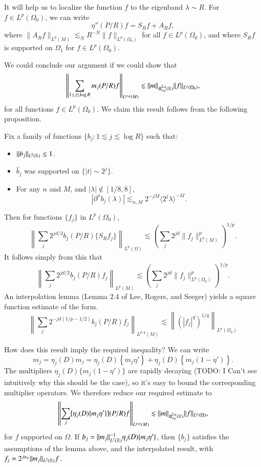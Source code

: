 It will help us to localize the function $f$ to the eigenband $\lambda \sim R$. For $f \in L^p(\Omega_0)$, we can write
%
\[ \eta''(P/R) f = S_R f + A_R f, \]
%
where $\| A_R f \|_{L^p(M)} \lesssim_N R^{-N} \| f \|_{L^p(\Omega_0)}$ for all $f \in L^p(\Omega_0)$, and where $S_R f$ is supported on $\Omega_1$ for $f \in L^p(\Omega_0)$.

We could conclude our argument if we could show that
%
\[ \left\| \sum_{1 \lesssim j \lesssim \log R} m_j(P/R) f \right\|_{L^{p,q}(M)} \lesssim \| m \|_{B_{\alpha_p}^{2,q}(\operatorname{\mathbb{R}})} \| f \|_{L^p(\Omega_0)}, \]
%
for all functions $f \in L^p(\Omega_0)$. We claim this result follows from the following proposition.

\begin{lemma}
    Fix a family of functions $\{ b_j: 1 \lesssim j \lesssim \log R \}$ such that:
    \begin{itemize}
        \item $\| b_j \|_{L^2(\operatorname{\mathbb{R}})} \lesssim 1$.

        \item $\widehat{b}_j$ was supported on $\{ |t| \sim 2^j \}$.

        \item For any $n$ and $M$, and $|\lambda| \not \in [1/8, 8]$,
        \[ |\partial^n b_j(\lambda)| \lesssim_{n,M} 2^{-jM} \langle 2^j \lambda \rangle^{-M}. \]
    \end{itemize}
    Then for functions $\{ f_j \}$ in $L^p(\Omega_0)$,
    \[ \left\| \sum_j 2^{jd/2} b_j(P/R) \{ S_R f_j \} \right\|_{L^p(\Omega)} \lesssim \left( \sum_j 2^{jd} \| f_j \|_{L^p(M)}^p \right)^{1/p}. \]
    It follows simply from this that
    \[ \left\| \sum_j 2^{jd/2} b_j(P/R) f_j \right\|_{L^p(M)} \lesssim \left( \sum_j 2^{jd} \| f_j \|_{L^p(\Omega_0)}^p \right)^{1/p}. \]
    An interpolation lemma (Lemma 2.4 of Lee, Rogers, and Seeger) yields a square function estimate of the form.
    \[ \left\| \sum_j 2^{-jd(1/p - 1/2)} b_j(P/R) f_j \right\|_{L^{p,q}(M)} \lesssim \left\| \left( |f_j|^q \right)^{1/q} \right\|_{L^p(\Omega_0)} \]
\end{lemma}

How does this result imply the required inequality? We can write
%
\[ m_j = \eta_j(D) m_j = \eta_j(D) \left\{ m_j \eta' \right\} + \eta_j(D) \left\{ m_j (1 - \eta') \right\}. \]
%
The multipliers $\eta_j(D) \{ m_j (1 - \eta') \}$ are rapidly decaying (TODO: I Can't see intuitively why this should be the case), so it's easy to bound the corresponding multiplier operators. We therefore reduce our required estimate to
%
\[ \left\| \sum_j [ \eta_j(D) \{ m_j \eta' \} ](P/R) f \right\|_{L^{p,q}(M)} \lesssim \| m \|_{B^{2,q}_{\alpha_p}(\operatorname{\mathbb{R}})} \| f \|_{L^p(\Omega)}, \]
%
for $f$ supported on $\Omega$. If $b_j = \| m_j \|_{L^2(\operatorname{\mathbb{R}})}^{-1} \eta_j(D) \{ m_j \eta' \}$, then $\{ b_j \}$ satisfies the assumptions of the lemma above, and the interpolated result, with $f_j = 2^{j \alpha_p} \| m_j \|_{L^2(\operatorname{\mathbb{R}})} f$.

